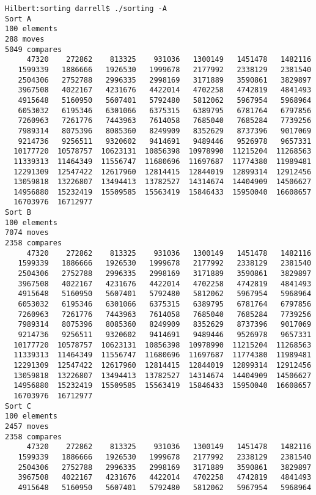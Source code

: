 \documentclass{article}
\begin{document}
\begin{lstlisting}
Hilbert:sorting darrell$ ./sorting -A
Sort A
100 elements
288 moves
5049 compares
     47320    272862    813325    931036   1300149   1451478   1482116
   1599339   1886666   1926530   1999678   2177992   2338129   2381540
   2504306   2752788   2996335   2998169   3171889   3590861   3829897
   3967508   4022167   4231676   4422014   4702258   4742819   4841493
   4915648   5160950   5607401   5792480   5812062   5967954   5968964
   6053032   6195346   6301066   6375315   6389795   6781764   6797856
   7260963   7261776   7443963   7614058   7685040   7685284   7739256
   7989314   8075396   8085360   8249909   8352629   8737396   9017069
   9214736   9256511   9320602   9414691   9489446   9526978   9657331
  10177720  10578757  10623131  10856398  10978990  11215204  11268563
  11339313  11464349  11556747  11680696  11697687  11774380  11989481
  12291309  12547422  12617960  12814415  12844019  12899314  12912456
  13059818  13226807  13494413  13782527  14314674  14404909  14506627
  14956880  15232419  15509585  15563419  15846433  15950040  16608657
  16703976  16712977
Sort B
100 elements
7074 moves
2358 compares
     47320    272862    813325    931036   1300149   1451478   1482116
   1599339   1886666   1926530   1999678   2177992   2338129   2381540
   2504306   2752788   2996335   2998169   3171889   3590861   3829897
   3967508   4022167   4231676   4422014   4702258   4742819   4841493
   4915648   5160950   5607401   5792480   5812062   5967954   5968964
   6053032   6195346   6301066   6375315   6389795   6781764   6797856
   7260963   7261776   7443963   7614058   7685040   7685284   7739256
   7989314   8075396   8085360   8249909   8352629   8737396   9017069
   9214736   9256511   9320602   9414691   9489446   9526978   9657331
  10177720  10578757  10623131  10856398  10978990  11215204  11268563
  11339313  11464349  11556747  11680696  11697687  11774380  11989481
  12291309  12547422  12617960  12814415  12844019  12899314  12912456
  13059818  13226807  13494413  13782527  14314674  14404909  14506627
  14956880  15232419  15509585  15563419  15846433  15950040  16608657
  16703976  16712977
Sort C
100 elements
2457 moves
2358 compares
     47320    272862    813325    931036   1300149   1451478   1482116
   1599339   1886666   1926530   1999678   2177992   2338129   2381540
   2504306   2752788   2996335   2998169   3171889   3590861   3829897
   3967508   4022167   4231676   4422014   4702258   4742819   4841493
   4915648   5160950   5607401   5792480   5812062   5967954   5968964

\end{lstlisting}
\end{document}
